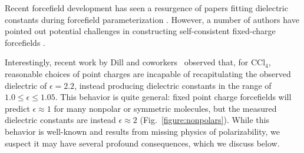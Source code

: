 \documentclass[aps,pre,twocolumn,nofootinbib,superscriptaddress,linenumbers]{revtex4-1}
\begin{document}
Recent forcefield development has seen a resurgence of papers fitting dielectric constants during forcefield parameterization \cite{wang2014building, fennell2014fixed}.  
However, a number of authors have pointed out potential challenges in constructing self-consistent fixed-charge forcefields \cite{fennell2012simple, leontyev2014polarizable}.  


Interestingly, recent work by Dill and coworkers~\cite{fennell2012simple} observed that, for $\mathrm{CCl_4}$, reasonable choices of point charges are incapable of recapitulating the observed dielectric of $\epsilon = 2.2$, instead producing dielectric constants in the range of $1.0 \le \epsilon \le 1.05$.  
This behavior is quite general: fixed point charge forcefields will predict $\epsilon \approx 1$ for many nonpolar or symmetric molecules, but the measured dielectric constants are instead $\epsilon \approx 2$ (Fig.~\ref{figure:nonpolars}).  
While this behavior is well-known and results from missing physics of polarizability, we suspect it may have several profound consequences, which we discuss below.


\end{document}
